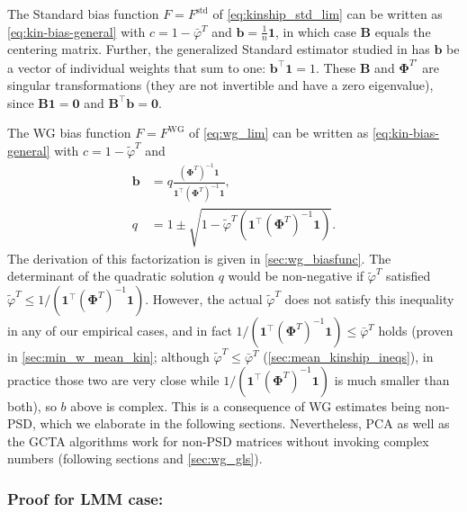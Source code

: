 \documentclass[9pt,twocolumn,twoside]{gsajnl}
\newcommand{\kinMat}[1][T]{\mathbf{\Phi}^{#1}}
\newcommand{\kinMatPrime}{\mathbf{\Phi}^{T\prime}}
\begin{document}
The Standard bias function $F = F^\text{std}$ of \cref{eq:kinship_std_lim} can be written as \cref{eq:kin-bias-general} with
$c = 1 - \bar{\varphi}^T$ and
$\mathbf{b} = \frac{1}{n} \mathbf{1}$, in which case $\mathbf{B}$ equals the centering matrix.
Further, the generalized Standard estimator studied in \citet{ochoa_estimating_2021} has $\mathbf{b}$ be a vector of individual weights that sum to one: $\mathbf{b}^\intercal \mathbf{1} = 1$.
These $\mathbf{B}$ and $\kinMatPrime$ are singular transformations (they are not invertible and have a zero eigenvalue), since $\mathbf{B} \mathbf{1} = \mathbf{0}$ and $\mathbf{B}^\intercal \mathbf{b} = \mathbf{0}$.

The WG bias function $F = F^\text{WG}$ of \cref{eq:wg_lim} can be written as \cref{eq:kin-bias-general} with
$c = 1 - \tilde{\varphi}^T$ and
\begin{align}
  \label{eq:wg-fac-b}
  \mathbf{b}
  &=
    q \frac{ \left( \kinMat \right)^{-1} \mathbf{1} }{ \mathbf{1}^\intercal \left( \kinMat \right)^{-1} \mathbf{1} }
    , \\
  \label{eq:wg-fac-q}
  q
  &=
    1 \pm \sqrt{1 - \tilde{\varphi}^T \left( \mathbf{1}^\intercal \left( \kinMat \right)^{-1} \mathbf{1} \right) }
.
\end{align}
The derivation of this factorization is given in \cref{sec:wg_biasfunc}.
The determinant of the quadratic solution $q$ would be non-negative if $\tilde{\varphi}^T$ satisfied
$
\tilde{\varphi}^T \le 1 / \left( \mathbf{1}^\intercal \left( \kinMat \right)^{-1} \mathbf{1} \right).
$
However, the actual $\tilde{\varphi}^T$ does not satisfy this inequality in any of our empirical cases, and in fact $1 / \left( \mathbf{1}^\intercal \left( \kinMat \right)^{-1} \mathbf{1} \right) \le \bar{\varphi}^T$ holds (proven in \cref{sec:min_w_mean_kin}; although $\tilde{\varphi}^T \le \bar{\varphi}^T$ (\cref{sec:mean_kinship_ineqs}), in practice those two are very close while $1 / \left( \mathbf{1}^\intercal \left( \kinMat \right)^{-1} \mathbf{1} \right)$ is much smaller than both), so $b$ above is complex.
This is a consequence of WG estimates being non-PSD, which we elaborate in the following sections.
Nevertheless, PCA as well as the GCTA algorithms work for non-PSD matrices without invoking complex numbers (following sections and \cref{sec:wg_gls}).

\subsubsection{Proof for LMM case:}
\end{document}
